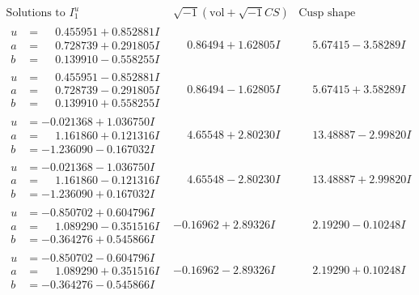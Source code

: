 \documentclass[1p]{elsarticle_modified}
\theoremstyle{definition}
\newcommand{\I}{\sqrt{-1}}
\begin{document}
$$\begin{array}{c|c|c}  
\text{Solutions to }I^u_{1}& \I (\text{vol} + \sqrt{-1}CS) & \text{Cusp shape}\\
 \hline 
\begin{aligned}
u &= \phantom{-}0.455951 + 0.852881 I \\
a &= \phantom{-}0.728739 + 0.291805 I \\
b &= \phantom{-}0.139910 - 0.558255 I\end{aligned}
 & \phantom{-}0.86494 + 1.62805 I & \phantom{-}5.67415 - 3.58289 I \\ \hline\begin{aligned}
u &= \phantom{-}0.455951 - 0.852881 I \\
a &= \phantom{-}0.728739 - 0.291805 I \\
b &= \phantom{-}0.139910 + 0.558255 I\end{aligned}
 & \phantom{-}0.86494 - 1.62805 I & \phantom{-}5.67415 + 3.58289 I \\ \hline\begin{aligned}
u &= -0.021368 + 1.036750 I \\
a &= \phantom{-}1.161860 + 0.121316 I \\
b &= -1.236090 - 0.167032 I\end{aligned}
 & \phantom{-}4.65548 + 2.80230 I & \phantom{-}13.48887 - 2.99820 I \\ \hline\begin{aligned}
u &= -0.021368 - 1.036750 I \\
a &= \phantom{-}1.161860 - 0.121316 I \\
b &= -1.236090 + 0.167032 I\end{aligned}
 & \phantom{-}4.65548 - 2.80230 I & \phantom{-}13.48887 + 2.99820 I \\ \hline\begin{aligned}
u &= -0.850702 + 0.604796 I \\
a &= \phantom{-}1.089290 - 0.351516 I \\
b &= -0.364276 + 0.545866 I\end{aligned}
 & -0.16962 + 2.89326 I & \phantom{-}2.19290 - 0.10248 I \\ \hline\begin{aligned}
u &= -0.850702 - 0.604796 I \\
a &= \phantom{-}1.089290 + 0.351516 I \\
b &= -0.364276 - 0.545866 I\end{aligned}
 & -0.16962 - 2.89326 I & \phantom{-}2.19290 + 0.10248 I \\ \hline\begin{aligned}

\end{aligned}
\end{array}$$
\end{document}
